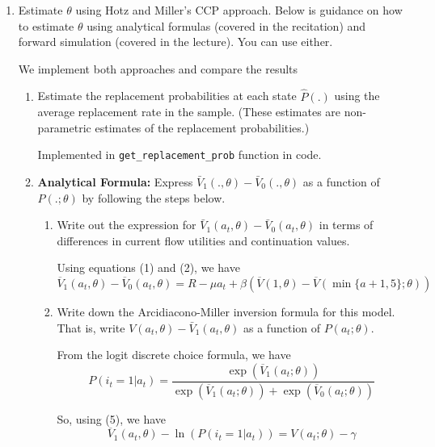 \documentclass{article}
\begin{document}
\begin{enumerate}
\item Estimate $\theta$ using Hotz and Miller’s CCP approach. Below is guidance on how to estimate $\theta$ using analytical formulas (covered in the recitation) and forward simulation (covered in the lecture). You can use either. 

\begin{answer}
We implement both approaches and compare the results
\end{answer}
\begin{enumerate}
\item Estimate the replacement probabilities at each state $\hat{P}(.)$ using the average replacement rate in the sample. (These estimates are non-parametric estimates of the replacement probabilities.)

\begin{answer}
    Implemented in \texttt{get\_replacement\_prob} function in code. 
\end{answer}

\item \textbf{Analytical Formula:} Express $\bar{V}_1(., \theta) - \bar{V}_0(., \theta)$ as a function of $P(.; \theta)$ by following the steps below.
\begin{enumerate}
\item Write out the expression for $\bar{V}_1(a_t, \theta) - \bar{V}_0(a_t, \theta)$ in terms of differences in current flow utilities and continuation values.

\begin{answer}
Using equations (1) and (2), we have
\begin{equation} \overline{V}_1(a_t, \theta) - \overline{V}_0(a_t, \theta) =R - \mu a_t + \beta \left( \overline{V}(1, \theta) -\overline{V}(\min\{a+1,5\}; \theta) \right)\end{equation}
\end{answer}

\item Write down the Arcidiacono-Miller inversion formula for this model. That is, write $V(a_t, \theta) - \bar{V}_1(a_t, \theta)$ as a function of $P(a_t; \theta)$. 

\begin{answer}


From the logit discrete choice formula, we have 
$$P(i_{t}=1|a_{t}) = \frac{\exp(\overline{V}_1(a_t;\theta))}{\exp(\overline{V}_1(a_t;\theta))+\exp(\overline{V}_0(a_t;\theta))}$$

So, using (5), we have $$ \overline{V}_1(a_t,\theta) -  \ln (P(i_t=1|a_t))
 = V(a_t;\theta) - \gamma $$


\end{answer}
\end{enumerate}
\end{enumerate}
\end{enumerate}
\end{document}

